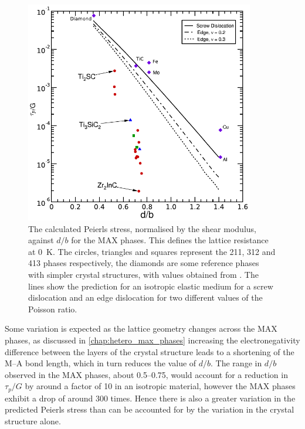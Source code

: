 \begin{figure}
\centering
\includegraphics[width=10cm]{tp_vs_d_upon_b}
\captionsetup{width=12cm}
\caption[The calculated Peierls stresses of the MAX phases.]{The calculated Peierls stress, normalised by the shear modulus, against $d/b$ for the MAX phases. This defines the lattice resistance at \SI{0}{\kelvin}. The circles, triangles and squares represent the 211, 312 and 413 phases respectively, the diamonds are some reference phases with simpler crystal structures, with values obtained from \cite{Clegg2006}. The lines show the prediction for an isotropic elastic medium for a screw dislocation and an edge dislocation for two different values of the Poisson ratio. \label{fig:peierls_stress_vs_d_upon_b}}
\end{figure}


Some variation is expected as the lattice geometry changes across the MAX phases, as discussed in \autoref{chap:hetero_max_phases} increasing the electronegativity difference between the layers of the crystal structure leads to a shortening of the M--A bond length, which in turn reduces the value of $d/b$. The range in $d/b$ observed in the MAX phases, about \numrange{0.5}{0.75}, would account for a reduction in $\tau_p / G $ by around a factor of \num{10} in an isotropic material, however the MAX phases exhibit a drop of around \num{300} times. Hence there is also a greater variation in the predicted Peierls stress than can be accounted for by the variation in the crystal structure alone. 



